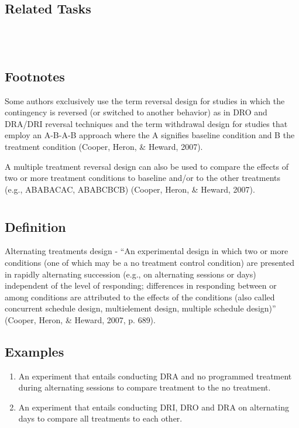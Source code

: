 \subsection{Related Tasks} 
\fourbThree{}\\ 
\fourjNine{}\\
%
\subsection{Footnotes}
Some authors exclusively use the term reversal design for studies in which the contingency is reversed  (or switched to another behavior) as in DRO and DRA/DRI reversal techniques and the term withdrawal design for studies that employ an A-B-A-B approach where the A signifies baseline condition and B the treatment condition (Cooper, Heron, \& Heward, 2007). 

A multiple treatment reversal design can also be used to compare the effects of two or more treatment conditions to baseline and/or to the other treatments (e.g., ABABACAC, ABABCBCB) (Cooper, Heron, \& Heward, 2007).
%
%
%
%
%
%
%
%
\section[\fourbFive{}]{\fourbFive{}%
              }
\subsection{Definition} 
Alternating treatments design - ``An experimental design in which two or more conditions (one of which may be a no treatment control condition) are presented in rapidly alternating succession (e.g., on alternating sessions or days) independent of the level of responding; differences in responding between or among conditions are attributed to the effects of the conditions (also called concurrent schedule design, multielement design, multiple schedule design)'' (Cooper, Heron, \& Heward, 2007, p. 689).
%
\subsection{Examples}
\begin{enumerate}
\item An experiment that entails conducting DRA and no programmed treatment during alternating sessions to compare treatment to the no treatment. 
\item An experiment that entails conducting DRI, DRO and DRA on alternating days to compare all treatments to each other. 
\end{enumerate}
%
